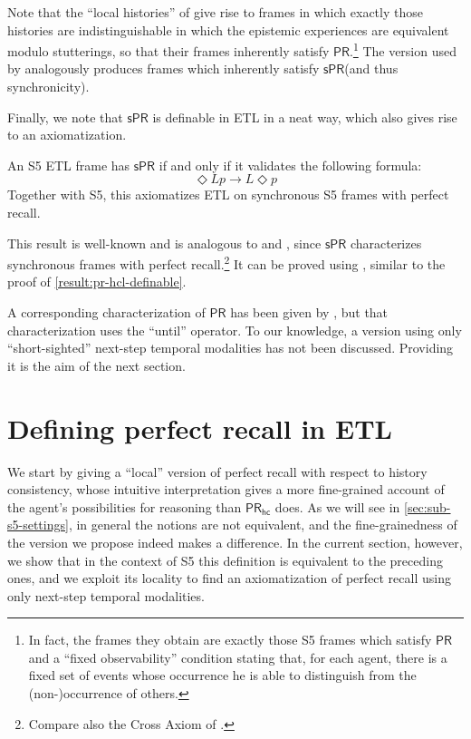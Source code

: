 \documentclass{article}
\newcommand{\PR}{\ensuremath{\mathsf{PR}}\xspace}
\newcommand{\PRs}{\ensuremath{\mathsf{sPR}}\xspace}
\newcommand{\PRhc}{\ensuremath{\mathsf{PR_{hc}}}\xspace}
\newcommand{\nextstep}{\Diamond}
\renewcommand{\implies}{\rightarrow}
\newcommand{\tiff}{if and only if\xspace}
\newcounter{#1}
\begin{document}
Note that the ``local histories'' of \citet{parikh_knowledge_2003}
give rise to frames in which exactly those histories are indistinguishable
in which the epistemic experiences are equivalent modulo stutterings,
so that their frames inherently satisfy \PR.\footnote{In fact, the frames they obtain are exactly those S5 frames
  which satisfy \PR and a ``fixed observability'' condition
  stating that, for each agent, there is a fixed set of events
  whose occurrence he is able to distinguish from the (non-)occurrence of others.}
The version used by \citet{pacuit_logic_2006} analogously produces frames
which inherently satisfy \PRs (and thus synchronicity).

\medskip

Finally, we note that \PRs is definable in ETL in a neat way, which also gives rise to an axiomatization.

\begin{proposition}
\label{result:pr-s-definable}
  An S5 ETL frame has \PRs \tiff it validates the following formula:
  \[
  \nextstep L p\implies L \nextstep p
  \]
  Together with S5, this axiomatizes ETL on synchronous S5 frames with perfect recall.
\end{proposition}
This result is well-known and is analogous to
\cite[Theorem~4]{van_der_meyden_complete_2003} and \cite[Theorem~3.6]{halpern_complete_2004},
since \PRs characterizes synchronous frames with perfect recall.\footnote{Compare also the Cross Axiom of \citet{dabrowski_topological_1996}.}
It can be proved using \citet{sahlqvist_completeness_1975},
similar to the proof of \cref{result:pr-hcl-definable}.

\medskip

A corresponding characterization of \PR has been given by \citet{van_der_meyden_axioms_1993},
but that characterization uses the ``until'' operator.
To our knowledge, a version using only ``short-sighted'' next-step temporal modalities
has not been discussed.
Providing it is the aim of the next section.

\section{Defining perfect recall in ETL}
\label{sec:char-pras-etl}

We start by giving a ``local'' version of perfect recall with respect to history consistency,
whose intuitive interpretation gives a more fine-grained account of the agent's possibilities for reasoning
than \PRhc does.
As we will see in \cref{sec:sub-s5-settings}, in general the notions are not equivalent,
and the fine-grainedness of the version we propose indeed makes a difference.
In the current section, however, we show that in the context of S5
this definition is equivalent to the preceding ones,
and we exploit its locality to find an axiomatization of perfect recall
using only next-step temporal modalities.
\end{document}
